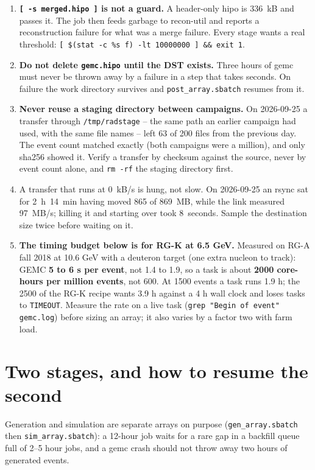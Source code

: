 \documentclass[11pt]{article}
\begin{document}
\begin{enumerate}
\begin{lstlisting}
export TMPDIR=$W
export JDK_JAVA_OPTIONS="-Djava.io.tmpdir=$W -Dorg.sqlite.tmpdir=$W"
...
unset JDK_JAVA_OPTIONS   # before run-groovy, which uses its own java
\end{lstlisting}
\item \textbf{\texttt{[ -s merged.hipo ]} is not a guard.} A header-only hipo is 336~kB and
  passes it. The job then feeds garbage to recon-util and reports a reconstruction failure
  for what was a merge failure. Every stage wants a real threshold:
  \texttt{[ \$(stat -c \%s f) -lt 10000000 ] \&\& exit 1}.
\item \textbf{Do not delete \texttt{gemc.hipo} until the DST exists.} Three hours of gemc must
  never be thrown away by a failure in a step that takes seconds. On failure the work
  directory survives and \texttt{post\_array.sbatch} resumes from it.
\item \textbf{Never reuse a staging directory between campaigns.} On 2026-09-25 a transfer
  through \texttt{/tmp/radstage} -- the same path an earlier campaign had used, with the same
  file names -- left 63 of 200 files from the previous day. The event count matched exactly
  (both campaigns were a million), and only sha256 showed it. Verify a transfer by checksum
  against the source, never by event count alone, and \texttt{rm -rf} the staging directory
  first.
\item A transfer that runs at 0~kB/s is hung, not slow. On 2026-09-25 an rsync sat for
  2~h~14~min having moved 865 of 869~MB, while the link measured 97~MB/s; killing it and
  starting over took 8~seconds. Sample the destination size twice before waiting on it.
\item \textbf{The timing budget below is for RG-K at 6.5 GeV.} Measured on
  RG-A fall 2018 at 10.6 GeV with a deuteron target (one extra nucleon to
  track): GEMC \textbf{5 to 6 s per event}, not 1.4 to 1.9, so a task is about
  \textbf{2000 core-hours per million events}, not 600. At 1500 events a task
  runs 1.9 h; the 2500 of the RG-K recipe wants 3.9 h against a 4 h wall clock
  and loses tasks to \texttt{TIMEOUT}. Measure the rate on a live task
  (\texttt{grep "Begin of event" gemc.log}) before sizing an array; it also
  varies by a factor two with farm load.
\end{enumerate}

\section{Two stages, and how to resume the second}
Generation and simulation are separate arrays on purpose (\texttt{gen\_array.sbatch} then
\texttt{sim\_array.sbatch}): a 12-hour job waits for a rare gap in a backfill queue full of
2--5 hour jobs, and a gemc crash should not throw away two hours of generated events.
\end{document}
